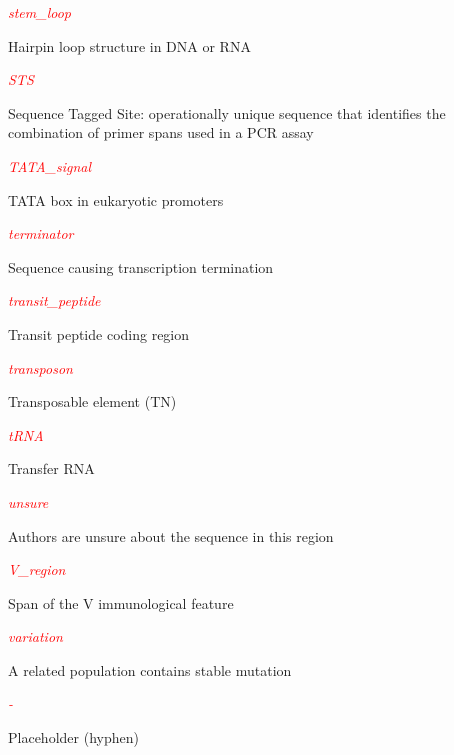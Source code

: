 \textcolor{red}{\textit{stem\_loop}}
\begin{adjustwidth}{2em}{}
Hairpin loop structure in DNA or RNA
\end{adjustwidth}

\textcolor{red}{\textit{STS}}
\begin{adjustwidth}{2em}{}
Sequence Tagged Site: operationally unique sequence that identifies the combination of primer spans used in a PCR assay
\end{adjustwidth}

\textcolor{red}{\textit{TATA\_signal}}
\begin{adjustwidth}{2em}{}
TATA box in eukaryotic promoters
\end{adjustwidth}

\textcolor{red}{\textit{terminator}}
\begin{adjustwidth}{2em}{}
Sequence causing transcription termination
\end{adjustwidth}

\textcolor{red}{\textit{transit\_peptide}}
\begin{adjustwidth}{2em}{}
Transit peptide coding region
\end{adjustwidth}

\textcolor{red}{\textit{transposon}}
\begin{adjustwidth}{2em}{}
Transposable element (TN)
\end{adjustwidth}

\textcolor{red}{\textit{tRNA}}
\begin{adjustwidth}{2em}{}
Transfer RNA
\end{adjustwidth}

\textcolor{red}{\textit{unsure}}
\begin{adjustwidth}{2em}{}
Authors are unsure about the sequence in this region
\end{adjustwidth}

\textcolor{red}{\textit{V\_region}}
\begin{adjustwidth}{2em}{}
Span of the V immunological feature
\end{adjustwidth}

\textcolor{red}{\textit{variation}}
\begin{adjustwidth}{2em}{}
A related population contains stable mutation
\end{adjustwidth}

\textcolor{red}{\textit{-}}
\begin{adjustwidth}{2em}{}
Placeholder (hyphen)
\end{adjustwidth}

